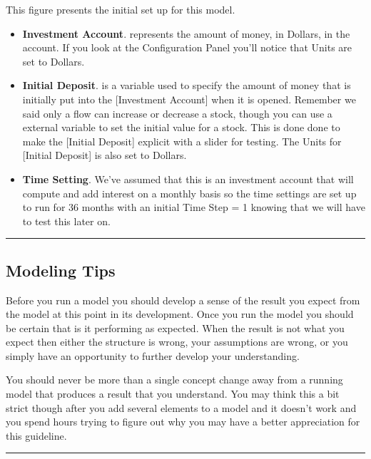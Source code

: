 \documentclass[]{memoir}
\begin{document}
This figure presents the initial set up for this model.

\begin{itemize}
\itemsep1pt\parskip0pt
\item
  \textbf{Investment Account}. represents the amount of money, in
  Dollars, in the account. If you look at the Configuration Panel you'll
  notice that Units are set to Dollars.
\item
  \textbf{Initial Deposit}. is a variable used to specify the amount of
  money that is initially put into the {[}Investment Account{]} when it
  is opened. Remember we said only a flow can increase or decrease a
  stock, though you can use a external variable to set the initial value
  for a stock. This is done done to make the {[}Initial Deposit{]}
  explicit with a slider for testing. The Units for {[}Initial
  Deposit{]} is also set to Dollars.
\item
  \textbf{Time Setting}. We've assumed that this is an investment
  account that will compute and add interest on a monthly basis so the
  time settings are set up to run for 36 months with an initial Time
  Step = 1 knowing that we will have to test this later on.
\end{itemize}

\begin{center}\rule{3in}{0.4pt}\end{center}

\subsection{Modeling Tips}

Before you run a model you should develop a sense of the result you
expect from the model at this point in its development. Once you run the
model you should be certain that is it performing as expected. When the
result is not what you expect then either the structure is wrong, your
assumptions are wrong, or you simply have an opportunity to further
develop your understanding.

You should never be more than a single concept change away from a
running model that produces a result that you understand. You may think
this a bit strict though after you add several elements to a model and
it doesn't work and you spend hours trying to figure out why you may
have a better appreciation for this guideline.

\begin{center}\rule{3in}{0.4pt}\end{center}
\end{document}
